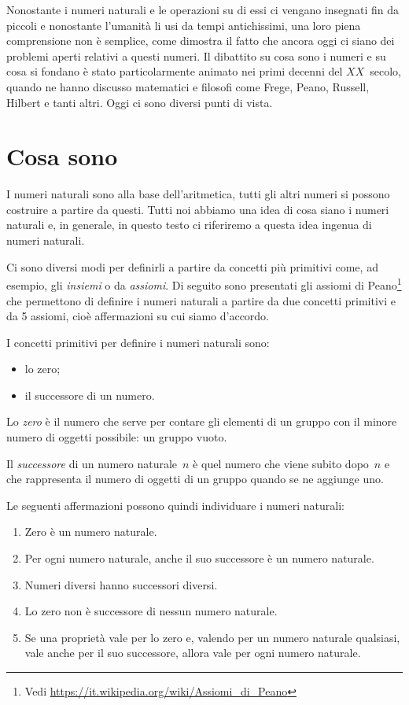 Nonostante i numeri naturali e le operazioni su di essi ci vengano 
insegnati fin da piccoli e nonostante l'umanità li usi da tempi 
antichissimi, una loro piena comprensione non è semplice, come dimostra il 
fatto che ancora oggi ci siano dei problemi aperti relativi a questi numeri. 
Il dibattito su cosa sono i numeri e su cosa si fondano è stato 
particolarmente animato nei primi decenni del \(XX\)~secolo, quando ne hanno 
discusso matematici e filosofi come Frege, Peano, Russell, Hilbert e tanti 
altri. Oggi ci sono diversi punti di vista.

\section{Cosa sono}
\label{sec:nat_definizione}

I numeri naturali sono alla base dell'aritmetica, 
tutti gli altri numeri si possono costruire a partire da questi. 
Tutti noi abbiamo una idea di cosa siano i numeri naturali e, in generale, 
in questo testo ci riferiremo a questa idea ingenua di numeri naturali.

Ci sono diversi modi per definirli a partire da concetti più primitivi 
come, ad esempio, gli \emph{insiemi} o da \emph{assiomi}.
Di seguito sono presentati gli assiomi di Peano\footnote{
Vedi \url{https://it.wikipedia.org/wiki/Assiomi_di_Peano}}
che permettono di definire i numeri naturali a partire da due concetti 
primitivi e da 5 assiomi, cioè affermazioni su cui siamo d'accordo.

I concetti primitivi per definire i numeri naturali sono:

\begin{itemize}[noitemsep]
 \item lo zero;
 \item il successore di un numero.
\end{itemize}

Lo \emph{zero} è il numero che serve per contare gli elementi di un gruppo 
con il minore numero di oggetti possibile: un gruppo vuoto.

Il \emph{successore} di un numero naturale~\(n\) è quel numero che viene 
subito dopo~\(n\) e che rappresenta il numero di oggetti di un gruppo quando 
se ne aggiunge uno.

Le seguenti affermazioni possono quindi individuare i numeri naturali:

\begin{enumerate}[noitemsep]
 \item Zero è un numero naturale.
 \item Per ogni numero naturale, anche il suo successore è un numero 
naturale.
 \item Numeri diversi hanno successori diversi.
 \item Lo zero non è successore di nessun numero naturale.
 \item Se una proprietà vale per lo zero e, 
   valendo per un numero naturale qualsiasi, 
   vale anche per il suo successore, 
   allora vale per ogni numero naturale.
\end{enumerate}

